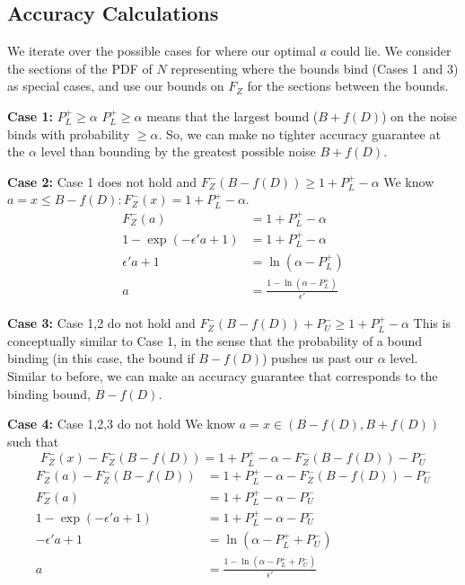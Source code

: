 \documentclass[11pt]{scrartcl} %
\begin{document}
\begin{appendices}
	\section{Accuracy Calculations}
	\label{appendix:accuracy}
	We iterate over the possible cases for where our optimal $a$ could lie.
	We consider the sections of the PDF of $N$ representing where the bounds bind (Cases 1 and 3) as special cases, and use our bounds on
	$F_{Z}$ for the sections between the bounds.

	\textbf{Case 1:} $P_{L}^{+} \geq \alpha$ \newline
	$P_{L}^{+} \geq \alpha$ means that the largest bound ($B + f(D)$) on the noise binds with probability $\geq \alpha$.
	So, we can make no tighter accuracy guarantee at the $\alpha$ level than bounding by the greatest possible noise $B + f(D)$. \newline

	\textbf{Case 2:} Case 1 does not hold and $F^{-}_{Z}(B - f(D)) \geq 1 + P_{L}^{+} - \alpha$ \newline
	We know $a = x \leq B - f(D): F_{Z}^{-}(x) = 1 + P_{L}^{+} - \alpha$.
	\begin{align}
	              	 F_{Z}^{-}(a) &= 1 + P_{L}^{+} - \alpha \nonumber \\
		1 - \exp(-\epsilon'a + 1) &= 1 + P_{L}^{+} - \alpha \nonumber \\
		           \epsilon'a + 1 &= \ln(\alpha - P_{L}^{+}) \nonumber \\
		                        a &= \frac{1 - \ln(\alpha - P_{L}^{+})}{\epsilon'} \nonumber
	\end{align}

	\textbf{Case 3:} Case 1,2 do not hold and $F^{-}_{Z}(B - f(D)) + P_{U}^{-} \geq 1 + P_{L}^{+} - \alpha$ \newline
	This is conceptually similar to Case 1, in the sense that the probability of a bound binding (in this case, the bound if $B - f(D)$) pushes us past our
	$\alpha$ level. Similar to before, we can make an accuracy guarantee that corresponds to the binding bound, $B - f(D)$. \newline

	\textbf{Case 4:} Case 1,2,3 do not hold \newline
	We know $a =  x \in (B - f(D), B + f(D))$ such that
	\[ F_{Z}^{-}(x) - F_{Z}^{-}(B - f(D)) = 1 + P_{L}^{+} - \alpha - F_{Z}^{-}(B - f(D)) - P_{U}^{-} \]
	\begin{align}
		F_{Z}^{-}(a) - F_{Z}^{-}(B - f(D)) &= 1 + P_{L}^{+} - \alpha - F_{Z}^{-}(B - f(D)) - P_{U}^{-} \nonumber \\
							  F_{Z}^{-}(a) &= 1 + P_{L}^{+} - \alpha - P_{U}^{-} \nonumber \\
				1 - \exp(-\epsilon' a + 1) &= 1 + P_{L}^{+} - \alpha - P_{U}^{-} \nonumber \\
						  -\epsilon' a + 1 &= \ln(\alpha - P_{L}^{+} + P_{U}^{-}) \nonumber \\
						                 a &= \frac{1 - \ln(\alpha - P_{L}^{+} + P_{U}^{-})}{\epsilon'} \nonumber
	\end{align}
\end{appendices}
\end{document}
